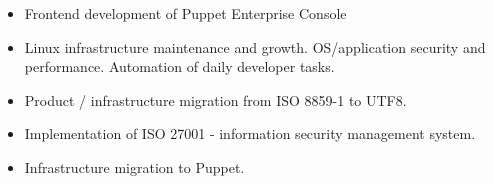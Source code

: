 \documentclass[10pt,a4paper]{altacv}
\begin{document}

\begin{fullwidth}
\makecvheader
\end{fullwidth}




    \begin{itemize}
      \item Frontend development of Puppet Enterprise Console
    \end{itemize}
  \divider

    \begin{itemize}
      \item Linux infrastructure maintenance and growth. OS/application security and performance. Automation of daily developer tasks.
      \item Product / infrastructure migration from ISO 8859-1 to UTF8.
      \item Implementation of ISO 27001 - information security management system.
      \item Infrastructure migration to Puppet.
    \end{itemize}
  \divider
\end{document}
